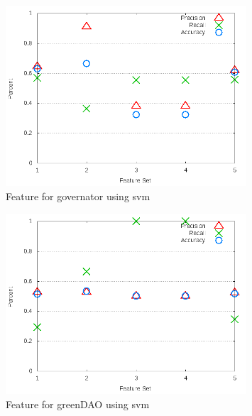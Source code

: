 \begin{figure}[!t]
\centering
\includegraphics[width=0.8\textwidth]{images/svm/test_3/governator_sample_range.png}
\caption{Feature for governator using \gls{svm}}
\label{fig:test_3_governator_svm}
\end{figure}

\begin{figure}[!t]
\centering
\includegraphics[width=0.8\textwidth]{images/svm/test_3/greenDAO_sample_range.png}
\caption{Feature for greenDAO using \gls{svm}}
\label{fig:test_3_greenDAO_svm}
\end{figure}

